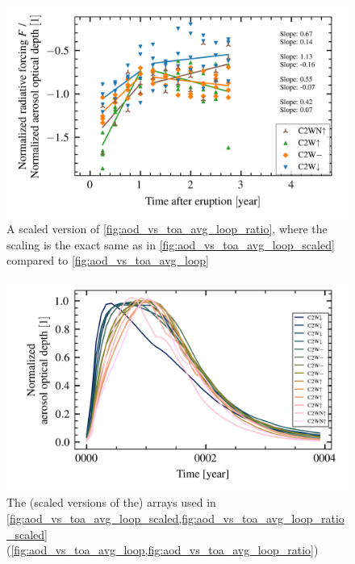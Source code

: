\documentclass[twocol]{ametsocV5}
\begin{document}
\begin{figure}
  \begin{center}
    \includegraphics[width=0.95\linewidth]{figures/aod_vs_toa_avg_loop_ratio_scaled.png}
  \end{center}
  \caption{
    A scaled version of \cref{fig:aod_vs_toa_avg_loop_ratio}, where the scaling is the
    exact same as in \cref{fig:aod_vs_toa_avg_loop_scaled} compared to
    \cref{fig:aod_vs_toa_avg_loop}
  }%
  \label{fig:aod_vs_toa_avg_loop_ratio_scaled}
\end{figure}

\begin{figure}
  \begin{center}
    \includegraphics[width=0.95\linewidth]{figures/aod_arrays_normalized.png}
  \end{center}
  \caption{
    The (scaled versions of the) arrays used in
    \cref{fig:aod_vs_toa_avg_loop_scaled,fig:aod_vs_toa_avg_loop_ratio_scaled}
    (\cref{fig:aod_vs_toa_avg_loop,fig:aod_vs_toa_avg_loop_ratio})
  }%
  \label{fig:aod_arrays_normalized}
\end{figure}
\end{document}
